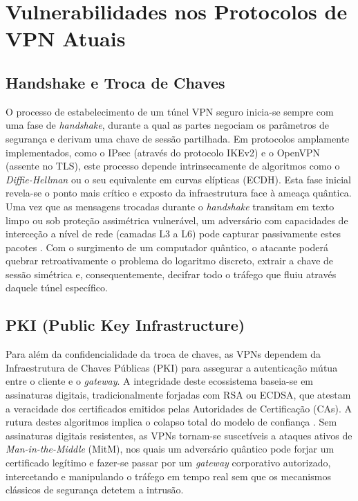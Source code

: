 \documentclass[runningheads]{llncs}
\begin{document}
\section{Vulnerabilidades nos Protocolos de VPN Atuais}

\subsection{Handshake e Troca de Chaves}
O processo de estabelecimento de um túnel VPN seguro inicia-se sempre com uma fase de \textit{handshake}, durante a qual as partes negociam os parâmetros de segurança e derivam uma chave de sessão partilhada. Em protocolos amplamente implementados, como o IPsec (através do protocolo IKEv2) e o OpenVPN (assente no TLS), este processo depende intrinsecamente de algoritmos como o \textit{Diffie-Hellman} ou o seu equivalente em curvas elípticas (ECDH). Esta fase inicial revela-se o ponto mais crítico e exposto da infraestrutura face à ameaça quântica. Uma vez que as mensagens trocadas durante o \textit{handshake} transitam em texto limpo ou sob proteção assimétrica vulnerável, um adversário com capacidades de interceção a nível de rede (camadas L3 a L6) pode capturar passivamente estes pacotes \cite{kundu2026postquantumcryptographicanalysismessage}. Com o surgimento de um computador quântico, o atacante poderá quebrar retroativamente o problema do logaritmo discreto, extrair a chave de sessão simétrica e, consequentemente, decifrar todo o tráfego que fluiu através daquele túnel específico.

\subsection{PKI (Public Key Infrastructure)}
Para além da confidencialidade da troca de chaves, as VPNs dependem da Infraestrutura de Chaves Públicas (PKI) para assegurar a autenticação mútua entre o cliente e o \textit{gateway}. A integridade deste ecossistema baseia-se em assinaturas digitais, tradicionalmente forjadas com RSA ou ECDSA, que atestam a veracidade dos certificados emitidos pelas Autoridades de Certificação (CAs). A rutura destes algoritmos implica o colapso total do modelo de confiança \cite{article}. Sem assinaturas digitais resistentes, as VPNs tornam-se suscetíveis a ataques ativos de \textit{Man-in-the-Middle} (MitM), nos quais um adversário quântico pode forjar um certificado legítimo e fazer-se passar por um \textit{gateway} corporativo autorizado, intercetando e manipulando o tráfego em tempo real sem que os mecanismos clássicos de segurança detetem a intrusão.
\end{document}
